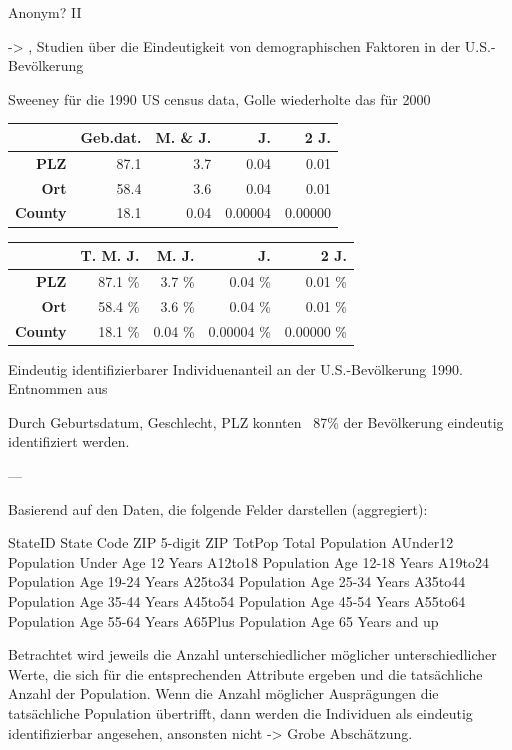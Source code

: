 \begin{frame}{Anonym? II}

-> \cite{sweeney_demographics}, \cite{golle_demographics} Studien über die Eindeutigkeit von demographischen Faktoren in der U.S.-Bevölkerung 

Sweeney für die 1990 US census data, Golle wiederholte das für 2000

\begin{center}
	\begin{tabular}{|r|r|r|r|r|}
	\hline	 & \textbf{Geb.dat.} & \textbf{M. \& J.} & \textbf{J.} & \textbf{2 J.} \\
	\hline \textbf{PLZ} & 87.1 & 3.7 & 0.04 & 0.01 \\
	\hline \textbf{Ort} & 58.4 & 3.6 & 0.04 & 0.01 \\
	\hline \textbf{County} & 18.1 & 0.04 & 0.00004 & 0.00000 \\
	\hline
	\end{tabular}
\end{center}

\begin{center}
	\begin{tabular}{|r|r|r|r|r|}
	\hline	 & \textbf{T. M. J.} & \textbf{M. J.} & \textbf{J.} & \textbf{2 J.} \\
	\hline \textbf{PLZ} & 87.1 \% & 3.7 \% & 0.04 \% & 0.01 \% \\
	\hline \textbf{Ort} & 58.4 \% & 3.6 \% & 0.04 \% & 0.01 \% \\
	\hline \textbf{County} & 18.1 \% & 0.04 \% & 0.00004 \% & 0.00000 \% \\
	\hline
	\end{tabular}
	\vspace{0.2cm}

	\tiny Eindeutig identifizierbarer Individuenanteil an der U.S.-Bevölkerung 1990. Entnommen aus \cite{sweeney_demographics}
\end{center}

Durch {Geburtsdatum, Geschlecht, PLZ} konnten ~87\% der Bevölkerung eindeutig identifiziert werden.

---

Basierend auf den Daten, die folgende Felder darstellen (aggregiert): 

StateID 	State Code 
ZIP 		5-digit ZIP 
TotPop 		Total Population 
AUnder12 	Population Under Age 12 Years 
A12to18 	Population Age 12-18 Years 
A19to24 	Population Age 19-24 Years 
A25to34 	Population Age 25-34 Years 
A35to44 	Population Age 35-44 Years 
A45to54 	Population Age 45-54 Years 
A55to64 	Population Age 55-64 Years 
A65Plus 	Population Age 65 Years and up 

Betrachtet wird jeweils die Anzahl unterschiedlicher möglicher unterschiedlicher Werte, die sich für die entsprechenden Attribute ergeben und die tatsächliche Anzahl der Population. Wenn die Anzahl möglicher Ausprägungen die tatsächliche Population übertrifft, dann werden die Individuen als eindeutig identifizierbar angesehen, ansonsten nicht -> Grobe Abschätzung.

\end{frame}

